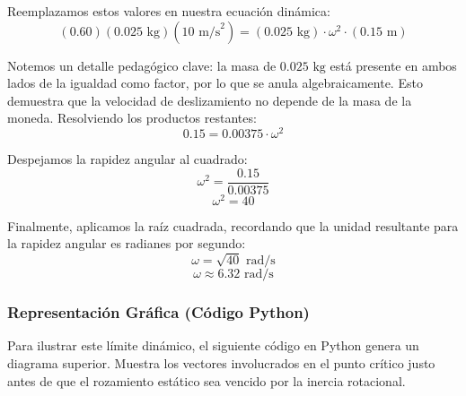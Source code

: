 \documentclass{article}
\begin{document}
Reemplazamos estos valores en nuestra ecuación dinámica:
$$(0.60)(0.025 \text{ kg})(10 \text{ m/s}^2) = (0.025 \text{ kg}) \cdot \omega^2 \cdot (0.15 \text{ m})$$

Notemos un detalle pedagógico clave: la masa de $0.025 \text{ kg}$ está presente en ambos lados de la igualdad como factor, por lo que se anula algebraicamente. Esto demuestra que la velocidad de deslizamiento no depende de la masa de la moneda. Resolviendo los productos restantes:
$$0.15 = 0.00375 \cdot \omega^2$$

Despejamos la rapidez angular al cuadrado:
$$\omega^2 = \frac{0.15}{0.00375}$$
$$\omega^2 = 40$$

Finalmente, aplicamos la raíz cuadrada, recordando que la unidad resultante para la rapidez angular es radianes por segundo:
$$\omega = \sqrt{40} \text{ rad/s}$$
$$\omega \approx 6.32 \text{ rad/s}$$

\subsubsection*{Representación Gráfica (Código Python)}
Para ilustrar este límite dinámico, el siguiente código en Python genera un diagrama superior. Muestra los vectores involucrados en el punto crítico justo antes de que el rozamiento estático sea vencido por la inercia rotacional.
\end{document}
